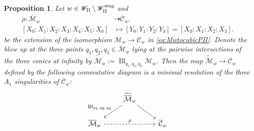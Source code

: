 \documentclass[a4paper,reqno]{amsart}
\numberwithin{equation}{section}
\newtheorem{proposition}[theorem]{Proposition}
\numberwithin{equation}{section}
\begin{document}
\begin{proposition} \label{prop:delPezzotocubicPII}
    Let $w \in \mathscr{W}_{\rm{II}}\setminus \mathscr{W}_{\rm{II}}^{\operatorname{sing}}$
    and 
    \begin{equation*}
    \begin{aligned}
        \rho : \overline{\mathcal{M}}_w &\dashrightarrow \overline{\mathcal{C}}_w,\\
        [X_0:X_1:X_2:X_3:X_4:X_5:X_6] &\mapsto [Y_0:Y_1:Y_2:Y_3]= [X_0:X_1:X_2:X_3].
    \end{aligned}
    \end{equation*}
     be the extension of the isomorphism $\mathcal{M}_w\to\mathcal{C}_w$ in \eqref{eq:MwtocubicPII}.
   Denote the blow up at the three points $q_1,q_2,q_3\in \overline{\mathcal{M}}_w$ lying at the pairwise intersections of the three conics at infinity by $\widetilde{\overline{\mathcal{M}}}_w:=\operatorname{Bl}_{q_1,q_2,q_3}\overline{\mathcal{M}}_w$. 
   Then the map $\widetilde{\overline{\mathcal{M}}}_w\to \overline{\mathcal{C}}_w$ defined by the following commutative diagram is a minimal resolution of the three $A_1$ singularities of $\overline{\mathcal{C}}_w$:
    \begin{equation*} 
        \begin{tikzcd}
            &   \widetilde{\overline{\mathcal{M}}}_w \arrow[dl,swap,  "\operatorname{Bl}_{q_1,q_2,q_3}"] \arrow[dr] & \\
            \overline{\mathcal{M}}_w  \arrow[rr,dashed, "\rho"]& & \overline{\mathcal{C}}_w
        \end{tikzcd}
    \end{equation*}
\end{proposition}
\end{document}
